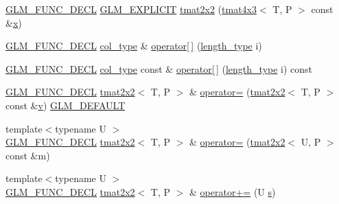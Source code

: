 \begin{DoxyCompactItemize}
\item 
\mbox{\hyperlink{setup_8hpp_ab2d052de21a70539923e9bcbf6e83a51}{G\+L\+M\+\_\+\+F\+U\+N\+C\+\_\+\+D\+E\+CL}} \mbox{\hyperlink{setup_8hpp_a6c74f5a5e7b134ab69023ff9a30d4d5d}{G\+L\+M\+\_\+\+E\+X\+P\+L\+I\+C\+IT}} \mbox{\hyperlink{structglm_1_1tmat2x2_a66947436834c7b463eb5d08c5aa6ef19}{tmat2x2}} (\mbox{\hyperlink{structglm_1_1tmat4x3}{tmat4x3}}$<$ T, P $>$ const \&\mbox{\hyperlink{glad_8h_a92d0386e5c19fb81ea88c9f99644ab1d}{x}})
\item 
\mbox{\hyperlink{setup_8hpp_ab2d052de21a70539923e9bcbf6e83a51}{G\+L\+M\+\_\+\+F\+U\+N\+C\+\_\+\+D\+E\+CL}} \mbox{\hyperlink{structglm_1_1tmat2x2_a9e4690f52926b475b36ed5f6209f22f4}{col\+\_\+type}} \& \mbox{\hyperlink{structglm_1_1tmat2x2_ae9e51d1d6b2d5f3ed9e42da1945b7998}{operator\mbox{[}$\,$\mbox{]}}} (\mbox{\hyperlink{structglm_1_1tmat2x2_a89bfd406715f8c3ae1c1f503d640fbb6}{length\+\_\+type}} i)
\item 
\mbox{\hyperlink{setup_8hpp_ab2d052de21a70539923e9bcbf6e83a51}{G\+L\+M\+\_\+\+F\+U\+N\+C\+\_\+\+D\+E\+CL}} \mbox{\hyperlink{structglm_1_1tmat2x2_a9e4690f52926b475b36ed5f6209f22f4}{col\+\_\+type}} const  \& \mbox{\hyperlink{structglm_1_1tmat2x2_a87ea7b7b3dc1e2a6d906942e73bbf72c}{operator\mbox{[}$\,$\mbox{]}}} (\mbox{\hyperlink{structglm_1_1tmat2x2_a89bfd406715f8c3ae1c1f503d640fbb6}{length\+\_\+type}} i) const
\item 
\mbox{\hyperlink{setup_8hpp_ab2d052de21a70539923e9bcbf6e83a51}{G\+L\+M\+\_\+\+F\+U\+N\+C\+\_\+\+D\+E\+CL}} \mbox{\hyperlink{structglm_1_1tmat2x2}{tmat2x2}}$<$ T, P $>$ \& \mbox{\hyperlink{structglm_1_1tmat2x2_a1ac298c5914990ffb37bb71d462648e5}{operator=}} (\mbox{\hyperlink{structglm_1_1tmat2x2}{tmat2x2}}$<$ T, P $>$ const \&\mbox{\hyperlink{glad_8h_a14cfbe2fc2234f5504618905b69d1e06}{v}}) \mbox{\hyperlink{setup_8hpp_aefce7051c376a64ba89fa93a9f63bc2c}{G\+L\+M\+\_\+\+D\+E\+F\+A\+U\+LT}}
\item 
{\footnotesize template$<$typename U $>$ }\\\mbox{\hyperlink{setup_8hpp_ab2d052de21a70539923e9bcbf6e83a51}{G\+L\+M\+\_\+\+F\+U\+N\+C\+\_\+\+D\+E\+CL}} \mbox{\hyperlink{structglm_1_1tmat2x2}{tmat2x2}}$<$ T, P $>$ \& \mbox{\hyperlink{structglm_1_1tmat2x2_a825289bb785c04c724709112352b9dc6}{operator=}} (\mbox{\hyperlink{structglm_1_1tmat2x2}{tmat2x2}}$<$ U, P $>$ const \&m)
\item 
{\footnotesize template$<$typename U $>$ }\\\mbox{\hyperlink{setup_8hpp_ab2d052de21a70539923e9bcbf6e83a51}{G\+L\+M\+\_\+\+F\+U\+N\+C\+\_\+\+D\+E\+CL}} \mbox{\hyperlink{structglm_1_1tmat2x2}{tmat2x2}}$<$ T, P $>$ \& \mbox{\hyperlink{structglm_1_1tmat2x2_abbd5502504beec0048c05e969aaaeb11}{operator+=}} (U \mbox{\hyperlink{glad_8h_af1b1d5edfea6a34daee7389b1b5810ad}{s}})

\end{DoxyCompactItemize}
